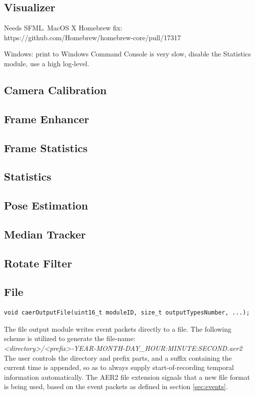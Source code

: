\documentclass[a4paper,12pt]{report}
\begin{document}
\subsection{Visualizer}

Needs SFML.
MacOS X Homebrew fix: https://github.com/Homebrew/homebrew-core/pull/17317

Windows: print to Windows Command Console is very slow, disable the Statistics module, use a high log-level.

\subsection{Camera Calibration}
\subsection{Frame Enhancer}
\subsection{Frame Statistics}
\subsection{Statistics}
\subsection{Pose Estimation}
\subsection{Median Tracker}
\subsection{Rotate Filter}

\subsection{File} \label{subsec:file}

\begin{lstlisting}
void caerOutputFile(uint16_t moduleID, size_t outputTypesNumber, ...);
\end{lstlisting}

The file output module writes event packets directly to a file.
The following scheme is utilized to generate the file-name:
\\\emph{<directory>/<prefix>-YEAR-MONTH-DAY\_HOUR:MINUTE:SECOND.aer2}
\\The user controls the directory and prefix parts, and a suffix containing the current time is appended, so as to always supply start-of-recording temporal information automatically.
The AER2 file extension signals that a new file format is being used, based on the event packets as defined in section \ref{sec:events}.
\end{document}
